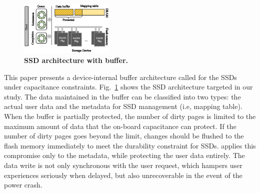 \begin{figure}[t]
    \centering{}
    \includegraphics[width=0.4\textwidth]{figure/dawid_ssd_archi.eps}
    \caption{\textbf{SSD architecture with \ours{} buffer.}}
    \label{fig_dawid_archi}
\end{figure}

This paper presents a device-internal buffer architecture called \ours{}
for the SSDs under capacitance constraints. 
Fig.~\ref{fig_dawid_archi} shows the SSD architecture targeted in our study. 
The data maintained in the buffer can be classified into two types: the actual user data and 
the metadata for SSD management (i.e, mapping table). 
When the buffer is partially protected, the number of dirty pages is limited to 
the maximum amount of data that the on-board capacitance can protect. 
If the number of dirty pages goes beyond the limit, changes should be flushed to the flash memory immediately
to meet the durability constraint for SSDs. 
\ours{} applies this compromise only to the metadata, while protecting the user data entirely. 
The data write is not only synchronous with the user request, which hampers user experiences seriously when delayed, but also unrecoverable in the event of the power crash. 


